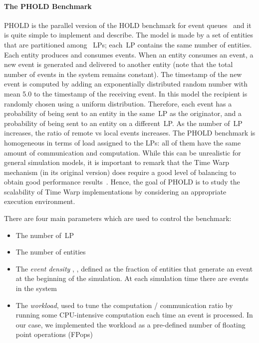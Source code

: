 \documentclass{sigplanconf}
\begin{document}
\paragraph{The PHOLD Benchmark}
PHOLD is the parallel version of the HOLD benchmark for event
queues~\cite{Jon86} and it is quite simple to implement and
describe. The model is made by a set of  entities that are
partitioned among ~\acp{LP}; each~\ac{LP} contains the same number
 of entities. Each entity produces and consumes events. When an
entity consumes an event, a new event is generated and delivered to
another entity (note that the total number of events in the system
remains constant). The timestamp of the new event is computed by
adding an exponentially distributed random number with mean 5.0 to the
timestamp of the receiving event. In this model the recipient is
randomly chosen using a uniform distribution. Therefore, each event
has a probability  of being sent to an entity in the same~\ac{LP}
as the originator, and a probability  of being sent to an
entity on a different~\ac{LP}. As the number  of~\ac{LP} increases,
the ratio of remote vs local events increases. The PHOLD benchmark is
homogeneous in terms of load assigned to the LPs: all of them have the
same amount of communication and computation. While this can be
unrealistic for general simulation models, it is important to remark
that the Time Warp mechanism (in its original version) does require a
good level of balancing to obtain good performance
results~\cite{Carothers2000,Gda11}. Hence, the goal of PHOLD is to
study the scalability of Time Warp implementations by considering an
appropriate execution environment.

There are four main parameters which are used to control the
benchmark:
\begin{itemize}
\item The number  of~\ac{LP}
\item The number  of entities
\item The \emph{event density} , , defined as
  the fraction of entities that generate an event at the beginning of
  the simulation. At each simulation time there are  events in
  the system
\item The \emph{workload}, used to tune the computation /
  communication ratio by running some CPU-intensive computation each
  time an event is processed. In our case, we implemented the workload
  as a pre-defined number of floating point operations (FPops)
\end{itemize}
\end{document}
